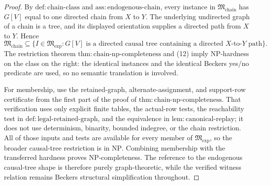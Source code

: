 \documentclass{article}
\begin{document}
\begin{proof}
By \(\mathrm{def:chain\mbox{-}class}\) and \(\mathrm{ass:endogenous\mbox{-}chain}\), every instance in \(\mathfrak M_{\mathrm{chain}}\) has \(G[V]\) equal to one directed chain from \(X\) to \(Y\).  The underlying undirected graph of a chain is a tree, and its displayed orientation supplies a directed path from \(X\) to \(Y\).  Hence
\[
 \mathfrak M_{\mathrm{chain}}
 \subseteq
 \{I\in\mathfrak M_{\mathrm{exp}}:G[V]\text{ is a directed causal tree containing a directed \(X\)-to-\(Y\) path}\}. \tag{12}
\]
The restriction theorem \(\mathrm{thm:chain\mbox{-}np\mbox{-}completeness}\) and (12) imply \(\mathrm{NP}\)-hardness on the class on the right: the identical instances and the identical Beckers yes/no predicate are used, so no semantic translation is involved.

For membership, use the retained-graph, alternate-assignment, and support-row certificate from the first part of the proof of \(\mathrm{thm:chain\mbox{-}np\mbox{-}completeness}\).  That verification uses only explicit finite tables, the actual-row tests, the reachability test in \(\mathrm{def:legal\mbox{-}retained\mbox{-}graph}\), and the equivalence in \(\mathrm{lem:canonical\mbox{-}replay}\); it does not use determinism, binarity, bounded indegree, or the chain restriction.  All of those inputs and tests are available for every member of \(\mathfrak M_{\mathrm{exp}}\), so the broader causal-tree restriction is in \(\mathrm{NP}\).  Combining membership with the transferred hardness proves \(\mathrm{NP}\)-completeness.  The reference to the endogenous causal-tree shape is therefore purely graph-theoretic, while the verified witness relation remains Beckers structural simplification throughout.
\end{proof}
\end{document}
